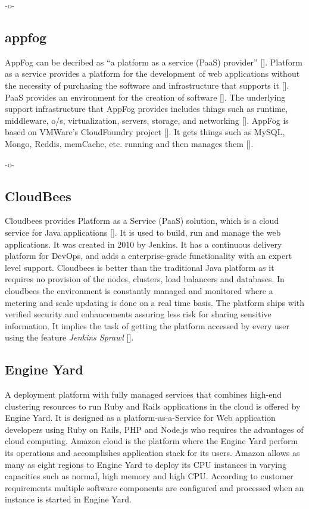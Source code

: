    -o-
 
    
\subsection{appfog}

AppFog can be decribed as ``a platform as a service (PaaS)
provider'' [\cite{wee}]. Platform as a service provides a platform for
the development of web applications without the necessity of
purchasing the software and infrastructure that supports
it [\cite{kepes}]. PaaS provides an environment for the creation of
software [\cite{kepes}]. The underlying support infrastructure that
AppFog provides includes things such as runtime, middleware, o/s,
virtualization, servers, storage, and networking [\cite{appfog}]. AppFog
is based on VMWare's CloudFoundry project [\cite{wee}]. It gets things
such as MySQL, Mongo, Reddis, memCache, etc. running and then manages
them [\cite{tweney}].

    -o-
    
\subsection{CloudBees}

Cloudbees provides Platform as a Service (PaaS) solution, which is a
cloud service for Java applications [\cite{www-cloudbees-wiki}]. It is
used to build, run and manage the web applications. It was created in
2010 by Jenkins. It has a continuous delivery platform for DevOps, and
adds a enterprise-grade functionality with an expert level
support. Cloudbees is better than the traditional Java platform as it
requires no provision of the nodes, clusters, load balancers and
databases. In cloudbees the environment is constantly managed and
monitored where a metering and scale updating is done on a real time
basis. The platform ships with verified security and enhancements
assuring less risk for sharing sensitive information. It implies the
task of getting the platform accessed by every user using the feature
\textit{Jenkins Sprawl} [\cite{www-cloudbees-webpage}].

\subsection{Engine Yard}

A deployment platform with fully managed services that combines
high-end clustering resources to run Ruby and Rails applications in
the cloud is offered by Engine Yard. It is designed as a
platform-as-a-Service for Web application developers using Ruby on
Rails, PHP and Node.js who requires the advantages of cloud
computing. Amazon cloud is the platform where the Engine Yard perform
its operations and accomplishes application stack for its
users. Amazon allows as many as eight regions to Engine Yard to deploy
its CPU instances in varying capacities such as normal, high memory
and high CPU. According to customer requirements multiple software
components are configured and processed when an instance is started in
Engine Yard.
    
